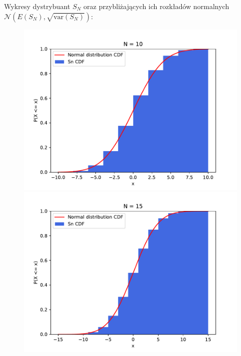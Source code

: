 \documentclass{article}
\begin{document}
Wykresy dystrybuant \( S_N \) oraz przybliżających ich rozkładów normalnych \( \mathcal{N}\left(E\left(S_N\right), \sqrt{\text{var}\left(S_N\right)}\right) \):\\
\begin{figure}[h!]
    \centering
    \begin{minipage}{0.45\textwidth}  %
        \centering
        \includegraphics[scale=0.5]{./plots/exc2/n10.pdf}
    \end{minipage}%
    \begin{minipage}{0.45\textwidth}  %
        \centering
        \includegraphics[scale=0.5]{./plots/exc2/n15.pdf}
    \end{minipage}
    

\end{figure}
\end{document}
